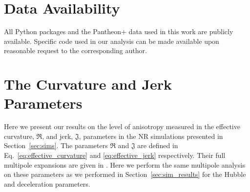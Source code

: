 \documentclass[fleqn,usenatbib]{mnras}
\begin{document}
\section*{Data Availability}
All Python packages and the Pantheon+ data used in this work are publicly available. Specific code used in our analysis can be made available upon reasonable request to the corresponding author.

 











\appendix


\section{The Curvature and Jerk Parameters}
\label{sec: curv_jerk}
Here we present {our results on the level of anisotropy measured in} the effective curvature, $\mathfrak{R}$, and jerk, $\mathfrak{J}$, parameters {in the NR simulations presented in}
Section~\ref{sec:sims}. 
{The parameters} $\mathfrak{R}$ and $\mathfrak{J}$ are defined in Eq.~\eqref{eq:effective_curvature} and \ref{eq:effective_jerk} respectively. Their full multipole expansions {are given} in \citet{Heinesen_2021}.
{Here we perform the same multipole analysis on these parameters as we performed in Section~\ref{sec:sim_results} for the Hubble and deceleration parameters. }
\end{document}
